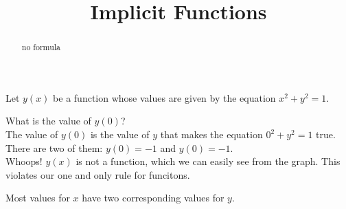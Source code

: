 \documentclass{ximera}
\title{Implicit Functions}
\begin{document}
\begin{abstract}
no formula
\end{abstract}
\maketitle






Let $y(x)$ be a function whose values are given by the equation $x^2 + y^2 = 1$.

What is the value of $y(0)$? \\

The value of $y(0)$ is the value of $y$ that makes the equation $0^2 + y^2 = 1$ true. \\

There are two of them: $y(0) = -1$ and $y(0) = -1$. \\


Whoops!  $y(x)$ is not a function, which we can easily see from the graph. This violates our one and only rule for funcitons.






\begin{image}
\end{image}


Most values for $x$ have two corresponding values for $y$. \\
\end{document}
